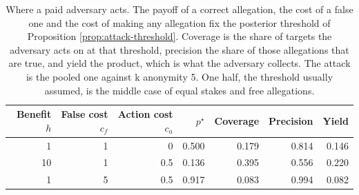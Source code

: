 \begin{table}[t]
\centering
\caption{Where a paid adversary acts. The payoff of a correct allegation, the cost of a false one and the cost of making any allegation fix the posterior threshold of Proposition \ref{prop:attack-threshold}. Coverage is the share of targets the adversary acts on at that threshold, precision the share of those allegations that are true, and yield the product, which is what the adversary collects. The attack is the pooled one against k anonymity 5. One half, the threshold usually assumed, is the middle case of equal stakes and free allegations.}
\label{tab:adversary}
\begin{tabular}{rrrrrrr}
\toprule
Benefit $h$ & False cost $c_f$ & Action cost $c_a$ & $p^\star$ & Coverage & Precision & Yield \\
\midrule
1 & 1 & 0 & 0.500 & 0.179 & 0.814 & 0.146 \\
10 & 1 & 0.5 & 0.136 & 0.395 & 0.556 & 0.220 \\
1 & 5 & 0.5 & 0.917 & 0.083 & 0.994 & 0.082 \\
\bottomrule
\end{tabular}
\end{table}
